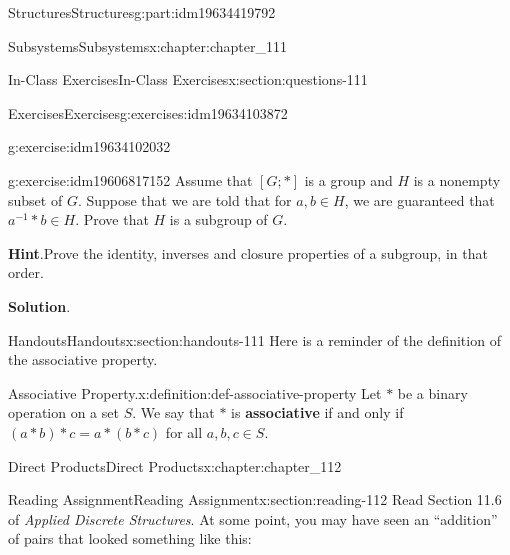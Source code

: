 \documentclass[oneside,10pt,]{book}
\newcommand{\blocktitlefont}{\relax}
\newcommand{\terminology}[1]{\textbf{#1}}
\numberwithin{equation}{section}
\begin{document}
\begin{partptx}{Structures}{}{Structures}{}{}{g:part:idm19634419792}
\begin{chapterptx}{Subsystems}{}{Subsystems}{}{}{x:chapter:chapter_111}
\begin{sectionptx}{In-Class Exercises}{}{In-Class Exercises}{}{}{x:section:questions-111}
\begin{exercises-subsection-numberless}{Exercises}{}{Exercises}{}{}{g:exercises:idm19634103872}
\begin{exercisegroup}
\begin{divisionexerciseeg}{3}{}{}{g:exercise:idm19634102032}
\end{divisionexerciseeg}%
\begin{divisionexerciseeg}{4}{}{}{g:exercise:idm19606817152}%
Assume that \([G;*]\) is a group and \(H\) is a nonempty subset of \(G\). Suppose that we are told that for \(a, b \in H\), we are guaranteed that \(a^{-1}*b \in H\).  Prove that \(H\) is a subgroup of \(G\).%
\par\smallskip%
\noindent\textbf{\blocktitlefont Hint}.\hypertarget{g:hint:idm19606815680}{}\quad{}Prove the identity, inverses and closure properties of a subgroup, in that order.%
\par\smallskip%
\noindent\textbf{\blocktitlefont Solution}.\hypertarget{g:solution:idm19606816256}{}\quad{}%
\end{divisionexerciseeg}%
\end{exercisegroup}
\par\medskip\noindent
\end{exercises-subsection-numberless}
\end{sectionptx}
%
%
\typeout{************************************************}
\typeout{************************************************}
%
\begin{sectionptx}{Handouts}{}{Handouts}{}{}{x:section:handouts-111}
Here is a reminder of the definition of the associative property.%
\begin{definition}{Associative Property.}{x:definition:def-associative-property}%
%
Let \(*\) be a binary operation on a set \(S\). We say that \(*\) is  \terminology{associative}  if and only if \((a * b) * c = a * (b * c)\) for all \(a, b, c \in  S\).%
\end{definition}
\end{sectionptx}
\end{chapterptx}
%
\typeout{************************************************}
\typeout{************************************************}
%
\begin{chapterptx}{Direct Products}{}{Direct Products}{}{}{x:chapter:chapter_112}
%
%
%
\typeout{************************************************}
\typeout{************************************************}
%
\begin{sectionptx}{Reading Assignment}{}{Reading Assignment}{}{}{x:section:reading-112}
Read Section 11.6 of \emph{Applied Discrete Structures}. At some point, you may have seen an ``addition'' of pairs that looked something like this:%

\end{sectionptx}
\end{chapterptx}
\end{partptx}
\end{document}
